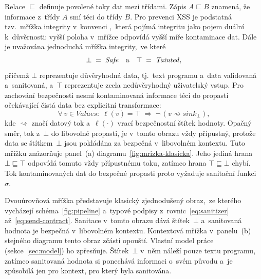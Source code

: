 Relace $\sqsubseteq$ definuje povolené toky dat mezi třídami. Zápis $A \sqsubseteq B$ znamená, že informace z~třídy $A$ smí téci do třídy $B$. Pro prevenci XSS je podstatná tzv.~mřížka integrity v~konvenci \textcite{sabelfeld2003language},~která pojímá integritu jako pojem duální k~důvěrnosti: vyšší poloha v~mřížce odpovídá vyšší míře kontaminace dat. Dále je uvažována jednoduchá mřížka integrity,~ve které
\[
    \bot \;=\; \text{\emph{Safe}} \quad\text{a}\quad \top \;=\; \text{\emph{Tainted}},
\]
přičemž $\bot$ reprezentuje důvěryhodná data, tj.~text programu a~data validovaná a~sanitovaná, a~$\top$ reprezentuje zcela nedůvěryhodný uživatelský vstup. Pro zachování bezpečnosti nesmí kontaminovaná informace téci do propasti očekávající čistá data bez explicitní transformace:
\begin{equation}
    \forall\, v \in \mathit{Values}:\; \ell(v) = \top \;\Longrightarrow\; \neg\,(v \rightsquigarrow \mathit{sink}_\bot),
    \label{eq:no-flow}
\end{equation}
kde $\rightsquigarrow$ značí datový tok a~$\ell(\cdot)$ vrací bezpečnostní štítek hodnoty. Opačný směr, tok z~$\bot$ do libovolné propasti, je v~tomto obrazu vždy přípustný, protože data se štítkem~$\bot$ jsou pokládána za bezpečná v~libovolném kontextu. Tuto mřížku znázorňuje panel~(a) diagramu~\ref{fig:mrizka-klasicka}. Jeho jediná hrana $\bot \sqsubseteq \top$ odpovídá tomuto vždy přípustnému toku, zatímco hrana $\top \sqsubseteq \bot$ chybí. Tok kontaminovaných dat do bezpečné propasti proto vyžaduje sanitační funkci~$\sigma$.

Dvouúrovňová mřížka představuje klasický zjednodušený obraz,~ze kterého vycházejí schéma~\ref{fig:pipeline} a~typové podpisy z~rovnic~\ref{eq:sanitizer} až~\ref{eq:send-contract}. Sanitace v~tomto obrazu dává štítek~$\bot$ a~sanitovaná hodnota je bezpečná v~libovolném kontextu. Kontextová mřížka v~panelu~(b) stejného diagramu tento obraz zčásti opouští. Vlastní model práce (sekce~\ref{sec:model}) ho zpřesňuje. Štítek~$\bot$ v~něm náleží pouze textu programu, zatímco sanitovaná hodnota si ponechává informaci o~svém původu a~je způsobilá jen pro kontext, pro který byla sanitována.

